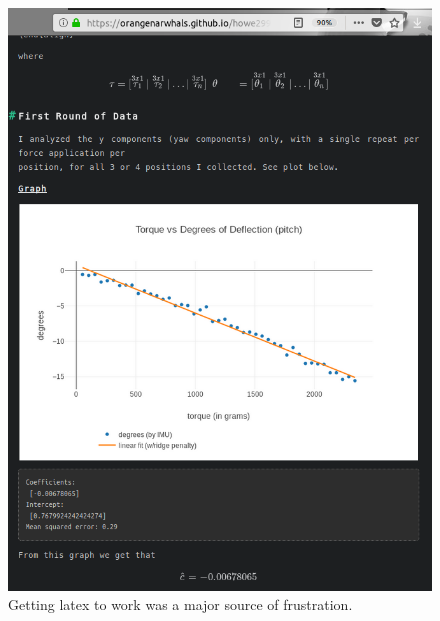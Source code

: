 \documentclass[preprint,12pt,3p]{elsarticle}
\begin{document}
\begin{figure}[H]
\centering
\includegraphics[width=.8\textwidth]{images/misc/blog_latex.png}
\caption{Getting latex to work was a major source of frustration.}
\end{figure}



%

%
\end{document}
